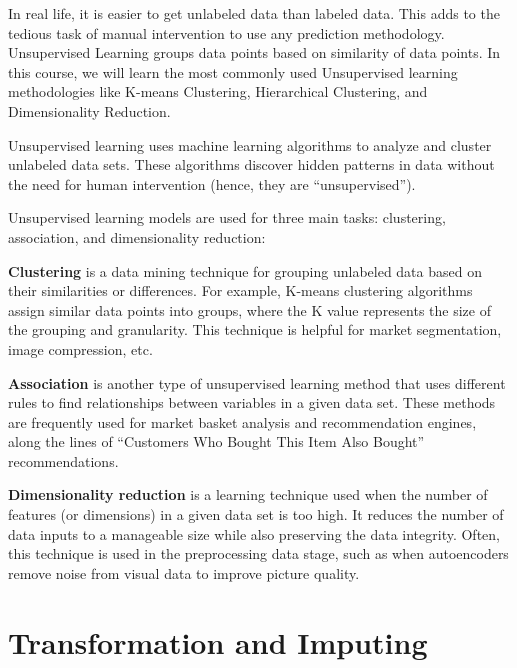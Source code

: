In real life, it is easier to get unlabeled data than labeled data. This adds to the tedious task of manual intervention to use any prediction methodology. Unsupervised Learning groups data points based on similarity of data points. In this course, we will learn the most commonly used Unsupervised learning methodologies like K-means Clustering, Hierarchical Clustering, and Dimensionality Reduction.

Unsupervised learning uses machine learning algorithms to analyze and cluster unlabeled data sets. These algorithms discover hidden patterns in data without the need for human intervention (hence, they are ``unsupervised'').

Unsupervised learning models are used for three main tasks: clustering, association, and dimensionality reduction:
	\begin{bulletedlist}
	\item \textbf{Clustering} is a data mining technique for grouping unlabeled data based on their similarities or differences. For example, K-means clustering algorithms assign similar data points into groups, where the K value represents the size of the grouping and granularity. This technique is helpful for market segmentation, image compression, etc.
	\item \textbf{Association} is another type of unsupervised learning method that uses different rules to find relationships between variables in a given data set. These methods are frequently used for market basket analysis and recommendation engines, along the lines of ``Customers Who Bought This Item Also Bought'' recommendations.
	\item \textbf{Dimensionality reduction} is a learning technique used when the number of features  (or dimensions) in a given data set is too high. It reduces the number of data inputs to a manageable size while also preserving the data integrity. Often, this technique is used in the preprocessing data stage, such as when autoencoders remove noise from visual data to improve picture quality.
	\end{bulletedlist}


	\section{Transformation and Imputing}

